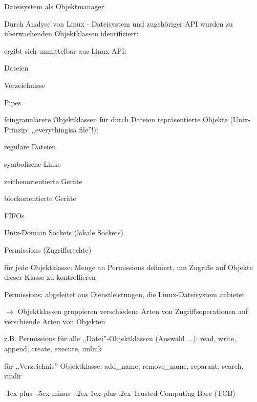 \documentclass[a4paper]{article}
\makeatletter
\renewcommand{\subsubsection}{\@startsection{subsubsection}{3}{0mm}%
 {-1ex plus -.5ex minus -.2ex}%
 {1ex plus .2ex}%
 {\normalfont\small\bfseries}}
\makeatother
\begin{document}
\begin{multicols}{3}
    Dateisystem als Objektmanager

    \begin{itemize*}
        \item
        Durch Analyse von Linux - Dateisystem und zugehöriger API wurden zu
        überwachenden Objektklassen identifiziert:
        \begin{itemize*}
            \item ergibt sich unmittelbar aus Linux-API: \begin{itemize*} \item   Dateien \item   Verzeichnisse \item   Pipes \end{itemize*}
            \item feingranularere Objektklassen für durch Dateien repräsentierte Objekte (Unix-Prinzip: ,,everythingisa file''!): \begin{itemize*} \item   reguläre Dateien \item   symbolische Links \item   zeichenorientierte Geräte \item   blockorientierte Geräte \item   FIFOs \item   Unix-Domain Sockets (lokale Sockets) \end{itemize*}
        \end{itemize*}
        \item
        Permissions (Zugriffsrechte)
        \item
        für jede Objektklasse: Menge an Permissions definiert, um Zugriffe auf
        Objekte dieser Klasse zu kontrollieren
        \item
        Permissions: abgeleitet aus Dienstleistungen, die Linux-Dateisystem
        anbietet
        \item
        $\rightarrow$  Objektklassen gruppieren verschiedene
        Arten von Zugriffsoperationen auf verschiende Arten von Objekten
        \item
        z.B. Permissions für alle ,,Datei''-Objektklassen (Auswahl ...): read,
        write, append, create, execute, unlink
        \item
        für ,,Verzeichnis''-Objektklasse: add\_name, remove\_name, reparant,
        search, rmdir
    \end{itemize*}


    \subsubsection{Trusted Computing Base
        (TCB)}


\end{multicols}
\end{document}
